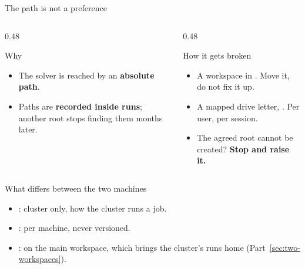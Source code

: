 \begin{frame}{The path is not a preference}
\begin{center}
{\Large\bfseries\color{hanblue}\code{\mainworkspace}}\par
\vspace{1mm}{\small one agreed root, the same for everybody}
\end{center}
\begin{columns}[T]
\begin{column}{0.48\textwidth}
\begin{block}{Why}
\begin{itemize}
  \item The solver is reached by an \textbf{absolute path}.
  \item Paths are \textbf{recorded inside runs}; another root stops finding
        them months later.
\end{itemize}
\end{block}
\end{column}
\begin{column}{0.48\textwidth}
\begin{alertblock}{How it gets broken}
\begin{itemize}
  \item A workspace in . Move it, do not fix it up.
  \item A mapped drive letter, . Per user, per session.
  \item The agreed root cannot be created? \textbf{Stop and raise it.}
\end{itemize}
\end{alertblock}
\end{column}
\end{columns}
\end{frame}

\begin{frame}{What differs between the two machines}
\begin{itemize}\small
  \item {}: cluster only, how the cluster runs a job.
  \item {}: per machine, never versioned.
  \item {}: on the main workspace, which
        brings the cluster's runs home (Part~\ref{sec:two-workspaces}).
\end{itemize}
\end{frame}

